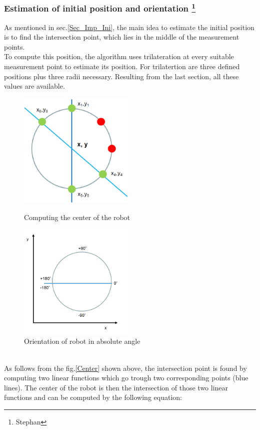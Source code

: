 \subsubsection[Estimation of initial position and orientation]{Estimation of initial position and orientation \footnote{Stephan}}
As mentioned in sec.\ref{Sec_Imp_Ini}, the main idea to estimate the initial position is to find the intersection point, which lies in the middle of the measurement points.\\
To compute this position, the algorithm uses trilateration at every suitable measurement point to estimate its position. For trilatertion are three defined positions plus three radii necessary. Resulting from the last section, all these values are available.\\
\begin{figure}[!htbp]
\centering
\begin{minipage}{.5\textwidth}
\centering
\includegraphics[width=5.5cm]{Pictures/Center_Rob} %
\caption{Computing the center of the robot}
\label{Center}
\end{minipage}%
\begin{minipage}{.5\textwidth}
\centering
\includegraphics[width=5.5cm]{Pictures/Orientation} %
\caption{Orientation of robot in absolute angle}
\label{Angle}
\end{minipage}
\end{figure}\\
As follows from the fig.\ref{Center} shown above, the intersection point is found by computing two linear functions which go trough two corresponding points (blue lines). The center of the robot is then the intersection of those two linear functions and can be computed by the following equation:
